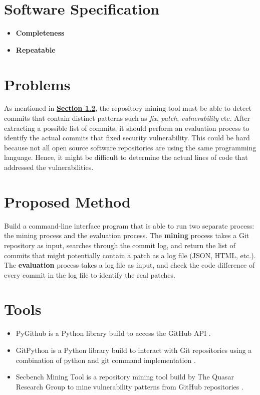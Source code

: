 \documentclass[12pt, a4paper]{report}
\begin{document}
\section{Software Specification}

\begin{itemize}
	\item \textbf{Completeness}
	\item \textbf{Repeatable}
\end{itemize}

\section{Problems}
As mentioned in \hyperref[sec:objectives]{\textbf{Section 1.2}}, the repository mining tool must be
able to detect commits that contain distinct patterns such as \textit{fix}, \textit{patch},
\textit{vulnerability} etc. After extracting a possible list of commits, it should perform an
evaluation process to identify the actual commits that fixed security vulnerability.	This could be
hard because not all open source software repositories are using the same programming language.
Hence, it might be difficult to determine the actual lines of code that addressed the
vulnerabilities.

\section{Proposed Method}
Build a command-line interface program that is able to run two separate process: the mining process
and the evaluation process. The \textbf{mining} process takes a Git repository as input, searches
through the commit log, and return the list of commits that might potentially contain a patch as a
log file (JSON, HTML, etc.). The \textbf{evaluation} process takes a log file as input, and check
the code difference of every commit in the log file to identify the real patches.

\section{Tools}
\begin{itemize}
	\item PyGithub is a Python library build to access the GitHub API \cite{pygithub}.
	\item GitPython is a Python library build to interact with Git repositories using a combination of
	python and git command implementation \cite{gitpython}.
	\item Secbench Mining Tool is a repository mining tool build by The Quasar Research Group to mine
	vulnerability patterns from GitHub repositories \cite{secbench}.
\end{itemize}
\end{document}
